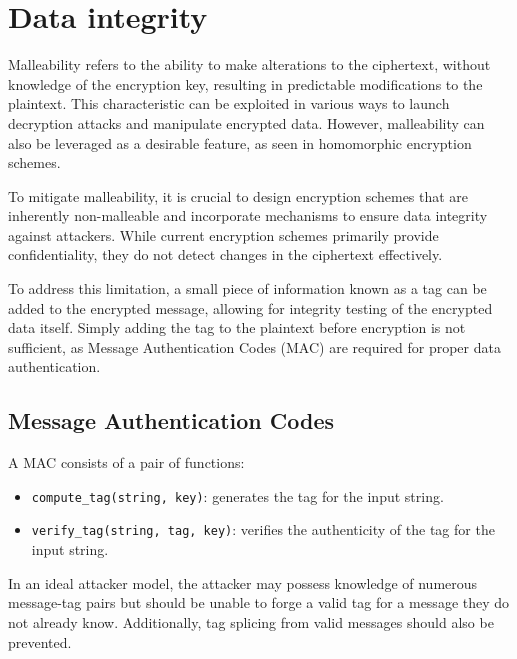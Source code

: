 \section{Data integrity}

Malleability refers to the ability to make alterations to the ciphertext, without knowledge of the encryption key, resulting in predictable modifications to the plaintext.
This characteristic can be exploited in various ways to launch decryption attacks and manipulate encrypted data.
However, malleability can also be leveraged as a desirable feature, as seen in homomorphic encryption schemes.

To mitigate malleability, it is crucial to design encryption schemes that are inherently non-malleable and incorporate mechanisms to ensure data integrity against attackers. 
While current encryption schemes primarily provide confidentiality, they do not detect changes in the ciphertext effectively.

To address this limitation, a small piece of information known as a tag can be added to the encrypted message, allowing for integrity testing of the encrypted data itself.
Simply adding the tag to the plaintext before encryption is not sufficient, as Message Authentication Codes (MAC) are required for proper data authentication.

\subsection{Message Authentication Codes}
A MAC consists of a pair of functions:
\begin{itemize}
    \item \texttt{compute\_tag(string, key)}: generates the tag for the input string.
    \item \texttt{verify\_tag(string, tag, key)}: verifies the authenticity of the tag for the input string.
\end{itemize}
In an ideal attacker model, the attacker may possess knowledge of numerous message-tag pairs but should be unable to forge a valid tag for a message they do not already know. 
Additionally, tag splicing from valid messages should also be prevented.


